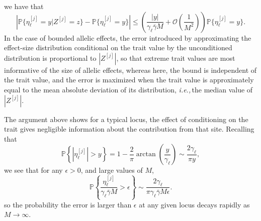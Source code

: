\documentclass{article}
\renewcommand{\P}{\mathbb{P}}
\newcommand{\ie}{\textit{i.e.,}\,}
\newcommand{\1}{\mathbbm{1}}
\newcommand{\Oh}{{\mathcal O}}
\DeclareMathOperator*{\sgn}{sgn}
\theoremstyle{remark}
\theoremstyle{definition}
\begin{document}
% 	
we have that
\[
    \left|
    \P\{\eta^{[j]}_{\ell} = y \vert Z^{[j]} = z\} - \P\{\eta^{[j]}_{\ell} = y\}
    \right|
    \le \left(\frac{|y|}{\gamma_\ell \bar{\gamma} M} + \Oh\left(\frac{1}{M^2}\right)\right)  \P\{\eta^{[j]}_{\ell} = y\}.
\]
In the case of bounded allelic effects, the error introduced by approximating the effect-size distribution conditional on the trait value by the unconditioned distribution is proportional to $|Z^{[j]}|$, so that extreme trait values are most informative of the size of allelic effects,
whereas here,
the bound is independent of the trait value,
and the error is maximized when the trait value is approximately equal to
the mean absolute deviation of its distribution, \ie the median value of $|Z^{[j]}|$.

The argument above shows for a typical locus, the effect of conditioning on the trait gives negligible information about the contribution from that site.   Recalling that
\[
    \P\left\{|\eta^{[j]}_{\ell}| > y\right\} =  1-\frac{2}{\pi} \arctan\left(\frac{y}{\gamma_{\ell}}\right) \sim \frac{2\gamma_{\ell}}{\pi y},
\]
we see that for any $\epsilon > 0$, and large values of $M$,
\[
    \P\left\{\frac{\eta^{[j]}_{\ell}}{\gamma_\ell \bar{\gamma} M} > \epsilon\right\} \sim \frac{2\gamma_{\ell}}{\pi \gamma_\ell \bar{\gamma} M \epsilon}.
\]
so the probability the error is larger than $\epsilon$ at any given locus decays rapidly as $M \to \infty$. 
\end{document}
